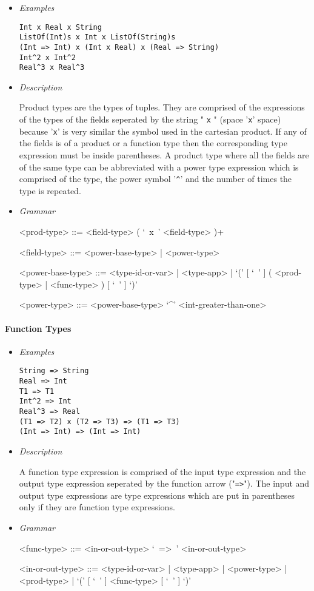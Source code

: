 \documentclass{article}
\begin{document}
\begin{itemize}
\item \textit{Examples}
\begin{verbatim}
Int x Real x String
ListOf(Int)s x Int x ListOf(String)s
(Int => Int) x (Int x Real) x (Real => String)
Int^2 x Int^2
Real^3 x Real^3
\end{verbatim}

\item \textit{Description}

Product types are the types of tuples. They are comprised of the expressions of
the types of the fields seperated by the string " \verb|x| " (space '\verb|x|'
space) because '\verb|x|' is very similar the symbol used in the cartesian
product. If any of the fields is of a product or a function type then the
corresponding type expression must be inside parentheses. A product type where
all the fields are of the same type can be abbreviated with a power type
expression which is comprised of the type, the power symbol '\verb|^|' and the
number of times the type is repeated.

\item \textit{Grammar}
\begin{grammar}
<prod-type> ::= <field-type> ( `\ x\ ' <field-type> )+

<field-type> ::= <power-base-type> | <power-type>

<power-base-type> ::=
<type-id-or-var> | <type-app> |
`(' [ `\ ' ] ( <prod-type> | <func-type> ) [ `\ ' ] `)'

<power-type> ::= <power-base-type> `^' <int-greater-than-one>
\end{grammar}
\end{itemize}

\paragraph{Function Types}

\begin{itemize}
\item \textit{Examples}
\begin{verbatim}
String => String 
Real => Int
T1 => T1
Int^2 => Int
Real^3 => Real
(T1 => T2) x (T2 => T3) => (T1 => T3)
(Int => Int) => (Int => Int)
\end{verbatim}

\item \textit{Description}

A function type expression is comprised of the input type expression and the
output type expression seperated by the function arrow ("\verb|=>|"). The
input and output type expressions are type expressions which are put in
parentheses only if they are function type expressions. 

\item \textit{Grammar}
\begin{grammar}
<func-type> ::= <in-or-out-type> `\ =>\ ' <in-or-out-type>

<in-or-out-type> ::=
<type-id-or-var> | <type-app> | <power-type> | <prod-type> |
`(' [ `\ ' ] <func-type>  [ `\ ' ] `)'
\end{grammar}
\end{itemize}
\end{document}

